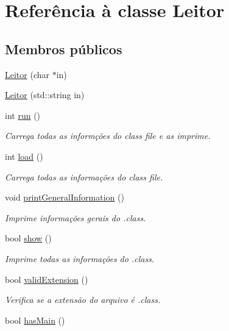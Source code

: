 \hypertarget{classLeitor}{}\section{Referência à classe Leitor}
\label{classLeitor}
\subsection*{Membros públicos}
\begin{DoxyCompactItemize}
\item 
\hyperlink{classLeitor_a0a1e8b666d75c2fd2c112affc0a8f55a}{Leitor} (char $\ast$in)
\item 
\hyperlink{classLeitor_a0ab1016df547c6e5081607b916eb7825}{Leitor} (std\+::string in)
\item 
int \hyperlink{classLeitor_a82a5ba05f6445e0c56f15eddecef21a3}{run} ()
\begin{DoxyCompactList}\small\item\em Carrega todas as informções do class file e as imprime. \end{DoxyCompactList}\item 
int \hyperlink{classLeitor_a69b1505dbce4cfdbb9fcb7e70ca639e6}{load} ()
\begin{DoxyCompactList}\small\item\em Carrega todas as informações do class file. \end{DoxyCompactList}\item 
void \hyperlink{classLeitor_a61890be2d648f47fcc6817ac8c751660}{print\+General\+Information} ()
\begin{DoxyCompactList}\small\item\em Imprime informações gerais do .class. \end{DoxyCompactList}\item 
bool \hyperlink{classLeitor_a1f50a340fba40d773af019975a3ab385}{show} ()
\begin{DoxyCompactList}\small\item\em Imprime todas as informações do .class. \end{DoxyCompactList}\item 
bool \hyperlink{classLeitor_a64ccb4aca8b2c665b79ace09a3423b77}{valid\+Extension} ()
\begin{DoxyCompactList}\small\item\em Verifica se a extensão do arquivo é .class. \end{DoxyCompactList}\item 
bool \hyperlink{classLeitor_a737ca7d70af56cab2c01fbfca0c774f7}{has\+Main} ()

\end{DoxyCompactItemize}
